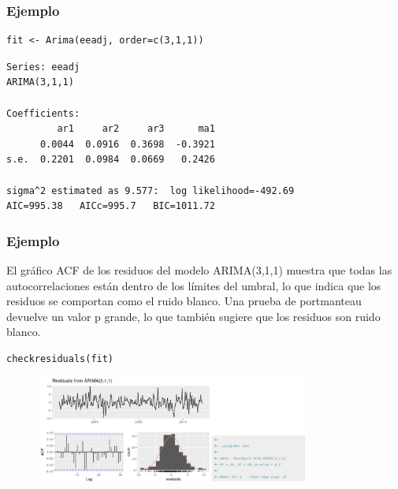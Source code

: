 \documentclass[10pt]{beamer}
\begin{document}





\begin{frame}[fragile]
\frametitle{Ejemplo}



\lstset{language=r,label= ,caption= ,captionpos=b,numbers=none}
\begin{lstlisting}
fit <- Arima(eeadj, order=c(3,1,1))
\end{lstlisting}

\pause

{\scriptsize
\begin{verbatim}
Series: eeadj 
ARIMA(3,1,1) 

Coefficients:
         ar1     ar2     ar3      ma1
      0.0044  0.0916  0.3698  -0.3921
s.e.  0.2201  0.0984  0.0669   0.2426

sigma^2 estimated as 9.577:  log likelihood=-492.69
AIC=995.38   AICc=995.7   BIC=1011.72
\end{verbatim}
}


\end{frame}






\begin{frame}[fragile]
\frametitle{Ejemplo}


\small El gráfico ACF de los residuos del modelo ARIMA(3,1,1) muestra que todas las autocorrelaciones están dentro de los límites del umbral, lo que indica que los residuos se comportan como el ruido blanco. Una prueba de portmanteau devuelve un valor p grande, lo que también sugiere que los residuos son ruido blanco.

\lstset{language=r,label= ,caption= ,captionpos=b,numbers=none}
\begin{lstlisting}
checkresiduals(fit)
\end{lstlisting}

\pause


\begin{figure}
\begin{center}
    \includegraphics[width=0.8\textwidth]{Imagen18.JPG}
\end{center}
\end{figure}

\end{frame}
\end{document}
